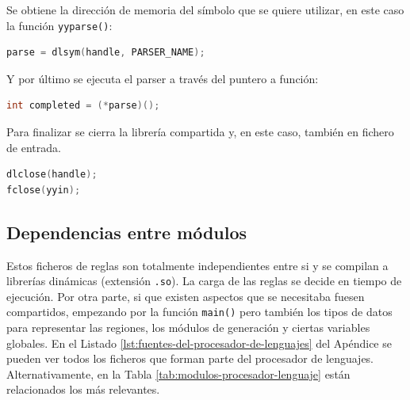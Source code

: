 Se obtiene la dirección de memoria del símbolo que se quiere utilizar, en este caso la función \verb|yyparse()|:

\begin{lstlisting}[language=C,caption={},label={}]
parse = dlsym(handle, PARSER_NAME);
\end{lstlisting}

Y por último se ejecuta el parser a través del puntero a función:

\begin{lstlisting}[language=C,caption={},label={}]
int completed = (*parse)();
\end{lstlisting}

Para finalizar se cierra la librería compartida y, en este caso, también en fichero de entrada.

\begin{lstlisting}[language=C,caption={},label={}]
dlclose(handle);
fclose(yyin);
\end{lstlisting}

\subsection{Dependencias entre módulos}





Estos ficheros de reglas son totalmente independientes entre si y se compilan a librerías dinámicas (extensión \verb|.so|). La carga de las reglas se decide en tiempo de ejecución. Por otra parte, si que existen aspectos que se necesitaba fuesen compartidos, empezando por la función \verb|main()| pero también los tipos de datos para representar las regiones, los módulos de generación y ciertas variables globales. En el Listado \ref{lst:fuentes-del-procesador-de-lenguajes} del Apéndice se pueden ver todos los ficheros que forman parte del procesador de lenguajes. Alternativamente, en la Tabla \ref{tab:modulos-procesador-lenguaje} están relacionados los más relevantes.


